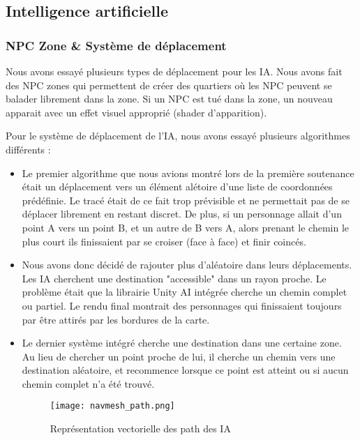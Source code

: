 \subsection{Intelligence artificielle}
    \subsubsection{NPC Zone \& Système de déplacement}
    Nous avons essayé plusieurs types de déplacement pour les IA. Nous avons fait des NPC zones qui permettent de créer des quartiers
    où les NPC peuvent se balader librement dans la zone. Si un NPC est tué dans la zone, un nouveau apparait avec un effet visuel 
    approprié (shader d'apparition).
    \newline
    
    Pour le système de déplacement de l'IA,
    nous avons essayé plusieurs algorithmes différents :\newline
    
    \begin{itemize}
        \item Le premier algorithme que nous avions montré lors de la première soutenance
        était un déplacement vers un élément alétoire d'une liste de coordonnées prédéfinie.
        Le tracé était de ce fait trop prévisible et ne permettait pas de se déplacer librement en restant discret.
        De plus, si un personnage allait d'un point A vers un point B, et un autre de B vers A,
        alors prenant le chemin le plus court ils finissaient par se croiser (face à face) et finir coincés.
        \newline
        \item Nous avons donc décidé de rajouter plus d'aléatoire dans leurs déplacements.
        Les IA cherchent une destination "accessible" dans un rayon proche.
        Le problème était que la librairie Unity AI intégrée cherche un chemin complet ou partiel.
        Le rendu final montrait des personnages qui finissaient toujours par être attirés par les bordures de la carte.
        \newline

        \item  Le dernier système intégré cherche une destination dans une certaine zone.
        Au lieu de chercher un point proche de lui, il cherche un chemin vers une destination aléatoire, 
        et recommence lorsque ce point est atteint ou si aucun chemin complet n'a été trouvé.

        
        \begin{figure}[hbt!]
            \centering
            \texttt{[image: navmesh\_path.png]}
            \caption{Représentation vectorielle des path des IA}
        \end{figure}
    

    \end{itemize}
    
